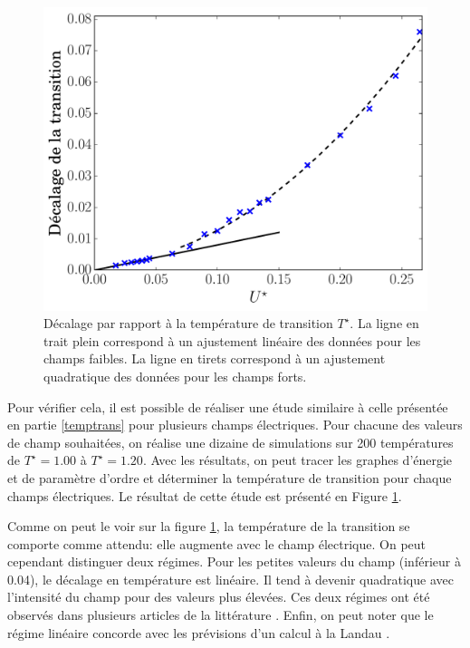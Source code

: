 \documentclass[11pt,a4paper]{article}
\numberwithin{equation}{section}
\begin{document}
\begin{figure}[h!]
    \centering      
    \includegraphics[scale=0.6]{figures/electricField.pdf}
    \caption{Décalage par rapport à la température de transition $T^\star$. La ligne en trait plein correspond à un ajustement linéaire des données pour les champs faibles. La ligne en tirets correspond à un ajustement quadratique des données pour les champs forts.}
        \label{electricField} 
\end{figure}

\newpage

Pour vérifier cela, il est possible de réaliser une étude similaire à celle présentée en partie \ref{temptrans} pour plusieurs champs électriques. Pour chacune des valeurs de champ souhaitées, on réalise une dizaine de simulations sur 200 températures de $T^\star = 1.00$ à $T^\star = 1.20$. Avec les résultats, on peut tracer les graphes d'énergie et de paramètre d'ordre et déterminer la température de transition pour chaque champs électriques. Le résultat de cette étude est présenté en Figure \ref{electricField}.
\medskip

Comme on peut le voir sur la figure \ref{electricField}, la température de la transition se comporte comme attendu: elle augmente avec le champ électrique. On peut cependant distinguer deux régimes. Pour les petites valeurs du champ (inférieur à 0.04), le décalage en température est linéaire. Il tend à devenir quadratique avec l'intensité du champ pour des valeurs plus élevées. Ces deux régimes ont été observés dans plusieurs articles de la littérature \cite{entropicelectric, field}. Enfin, on peut noter que le régime linéaire concorde avec les prévisions d'un calcul à la Landau \cite{landau}.
\end{document}
